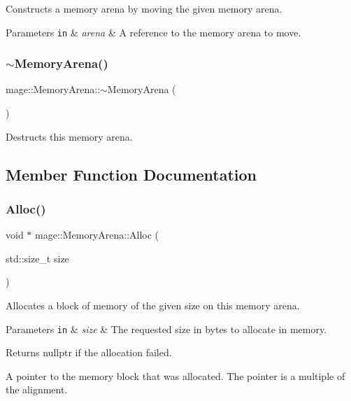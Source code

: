 Constructs a memory arena by moving the given memory arena.


\begin{DoxyParams}[1]{Parameters}
\mbox{\tt in}  & {\em arena} & A reference to the memory arena to move. \\
\hline
\end{DoxyParams}
\mbox{\label{classmage_1_1_memory_arena_acfee6fc205e2eaf6aeef4acf19948e6e}} 
\subsubsection{\texorpdfstring{$\sim$\+Memory\+Arena()}{~MemoryArena()}}
{\footnotesize\ttfamily mage\+::\+Memory\+Arena\+::$\sim$\+Memory\+Arena (\begin{DoxyParamCaption}{ }\end{DoxyParamCaption})}

Destructs this memory arena. 

\subsection{Member Function Documentation}
\mbox{\label{classmage_1_1_memory_arena_a6752498413d81158f8360f6d6e909b39}} 
\subsubsection{\texorpdfstring{Alloc()}{Alloc()}}
{\footnotesize\ttfamily void $\ast$ mage\+::\+Memory\+Arena\+::\+Alloc (\begin{DoxyParamCaption}\item[{std\+::size\+\_\+t}]{size }\end{DoxyParamCaption})}

Allocates a block of memory of the given size on this memory arena.


\begin{DoxyParams}[1]{Parameters}
\mbox{\tt in}  & {\em size} & The requested size in bytes to allocate in memory. \\
\hline
\end{DoxyParams}
\begin{DoxyReturn}{Returns}
{\ttfamily nullptr} if the allocation failed. 

A pointer to the memory block that was allocated. The pointer is a multiple of the alignment. 
\end{DoxyReturn}
\mbox{\label{classmage_1_1_memory_arena_a2236b6b1b4998eab780cc0bc398efcfa}} 

